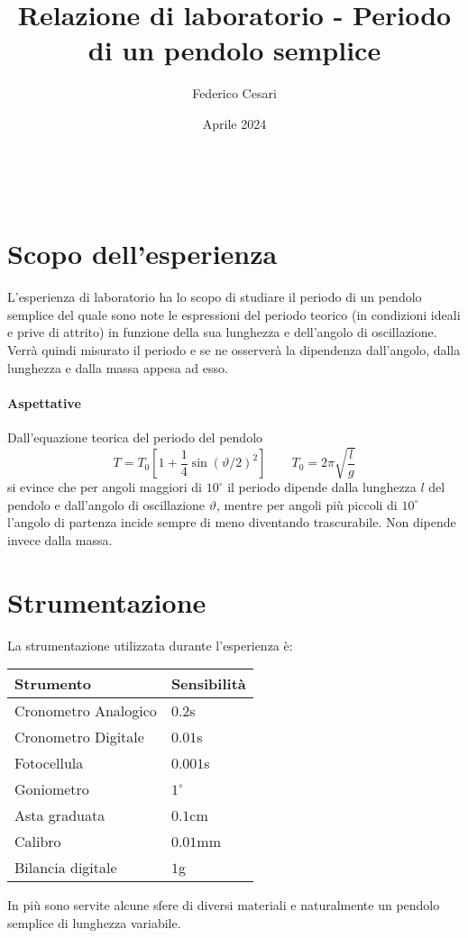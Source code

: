 \documentclass{article}
\title{Relazione di laboratorio - Periodo di un pendolo semplice}
\author{Federico Cesari}
\date{Aprile 2024}
\begin{document}
	
	\tableofcontents
	
	\newpage
	\textcolor{white}{.}
	\vfill
	\section{Scopo dell’esperienza}
	L'esperienza di laboratorio ha lo scopo di studiare il periodo di un pendolo semplice del quale sono note le espressioni del periodo teorico (in condizioni ideali e prive di attrito) in funzione della sua lunghezza e dell'angolo di oscillazione. Verrà quindi misurato il periodo e se ne osserverà la dipendenza dall'angolo, dalla lunghezza e dalla massa appesa ad esso.
	
	\paragraph{Aspettative} Dall'equazione teorica del periodo del pendolo 
	\begin{equation} \label{eq:1}
		T = T_0\left[1 + \frac{1}{4}\sin{(\vartheta/2)^2}\right] \qquad  T_0 = 2\pi \sqrt{\frac{l}{g}} 
	\end{equation}
	si evince che per angoli maggiori di $10^\circ$ il periodo dipende dalla lunghezza $l$ del pendolo e dall'angolo di oscillazione $\vartheta$, mentre per angoli più piccoli di  $10^\circ$ l'angolo di partenza incide sempre di meno diventando trascurabile. Non dipende invece dalla massa.
	
	\section{Strumentazione}
	La strumentazione utilizzata durante l'esperienza è:
	
	\begin{table}[H]
		\centering
		\begin{tabular}{@{}ll@{}}
			\textbf{Strumento} & \textbf{Sensibilità} \\ \midrule
			Cronometro Analogico      & $0.2$s               \\
			Cronometro Digitale       & $0.01$s              \\
			Fotocellula        & $0.001$s             \\
			Goniometro         & $1^\circ$            \\
			Asta graduata      & $0.1$cm              \\
			Calibro            & $0.01$mm             \\
			Bilancia digitale  & $1$g                 \\ \bottomrule
		\end{tabular}
	\end{table}
	\noindent
	In più sono servite alcune sfere di diversi materiali e naturalmente un pendolo semplice di lunghezza variabile.
	
\end{document}
